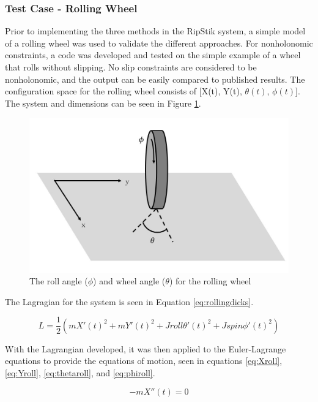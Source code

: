 \subsubsection{Test Case - Rolling Wheel}\label{sec:testcaserw}

Prior to implementing the three methods in the RipStik system, a simple model of a rolling wheel was used to validate the different approaches. For nonholonomic constraints, a code was developed and tested on the simple example of a wheel that rolls without slipping.
No slip constraints are considered to be nonholonomic, and the output can be easily compared to published results.
The configuration space for the rolling wheel consists of [X(t), Y(t), $\theta(t)$, $\phi(t)$]. 
The system and dimensions can be seen in Figure \ref{fig:rollwheel}.

\begin{figure}[!htb]
	\centering
	\includegraphics[width=\linewidth]{rollingwheel.JPG}
	\caption{The roll angle ($\phi$) and wheel angle ($\theta$) for the rolling wheel}\label{fig:rollwheel}
	\endminipage
\end{figure}

The Lagragian for the system is seen in Equation \ref{eq:rollingdicks}.

\begin{equation}
\label{eq:rollingdicks}
L=\frac{1}{2}(mX'(t)^2+mY'(t)^2+Jroll\theta'(t)^2+Jspin\phi'(t)^2)
\end{equation}

With the Lagrangian developed, it was then applied to the Euler-Lagrange equations to provide the equations of motion, seen in equations \ref{eq:Xroll}, \ref{eq:Yroll}, \ref{eq:thetaroll}, and \ref{eq:phiroll}.

\begin{equation}
\label{eq:Xroll}
-mX''(t)=0
\end{equation}

